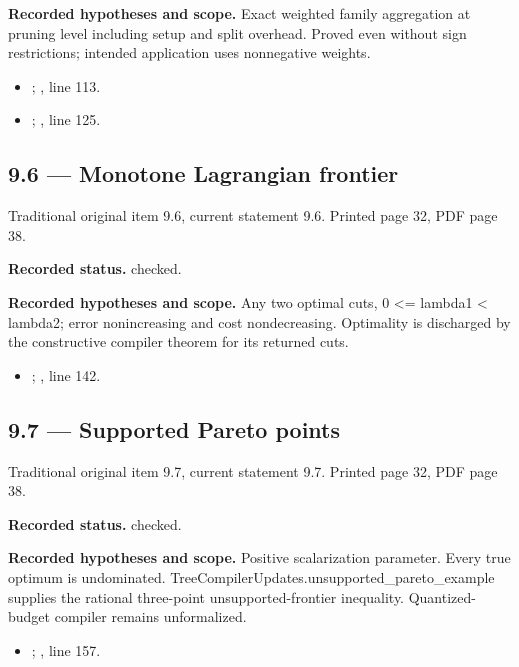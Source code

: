 \textbf{Recorded hypotheses and scope.} Exact weighted family aggregation at pruning level including setup and split overhead. Proved even without sign restrictions; intended application uses nonnegative weights.

\begin{itemize}
\item {}; , line 113.
\item {}; , line 125.
\end{itemize}
\subsection{9.6 — Monotone Lagrangian frontier}
\label{result:9.6}
{\footnotesize\color{muted}Traditional original item 9.6, current statement 9.6. Printed page 32, PDF page 38.}\par
\textbf{Recorded status.} checked.

\textbf{Recorded hypotheses and scope.} Any two optimal cuts, 0 <= lambda1 < lambda2; error nonincreasing and cost nondecreasing. Optimality is discharged by the constructive compiler theorem for its returned cuts.

\begin{itemize}
\item {}; , line 142.
\end{itemize}
\subsection{9.7 — Supported Pareto points}
\label{result:9.7}
{\footnotesize\color{muted}Traditional original item 9.7, current statement 9.7. Printed page 32, PDF page 38.}\par
\textbf{Recorded status.} checked.

\textbf{Recorded hypotheses and scope.} Positive scalarization parameter. Every true optimum is undominated. TreeCompilerUpdates.unsupported\_pareto\_example supplies the rational three-point unsupported-frontier inequality. Quantized-budget compiler remains unformalized.

\begin{itemize}
\item {}; , line 157.
\end{itemize}
